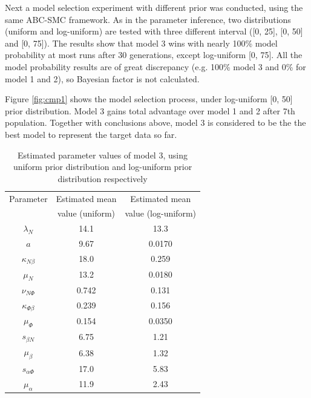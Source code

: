 \documentclass[12pt,a4paper]{report}
\begin{document}
Next a model selection experiment with different prior was conducted, using the same ABC-SMC framework. As in the parameter inference, two distributions (uniform and log-uniform) are tested with three different interval ([0, 25], [0, 50] and [0, 75]). The results show that model 3 wins with nearly 100\% model probability at most runs after 30 generations, except log-uniform [0, 75]. All the model probability results are of great discrepancy (e.g. 100\% model 3 and 0\% for model 1 and 2), so Bayesian factor is not calculated.

Figure \ref{fig:cmp1} shows the model selection process, under log-uniform [0, 50] prior distribution. Model 3 gains total advantage over model 1 and 2 after 7th population. Together with conclusions above, model 3 is considered to be the the best model to represent the target data so far.



\begin{table}[t!]
    \centering
    \begin{tabular}{|c c c|}
        \hline
        Parameter            & Estimated mean  & Estimated mean      \\
                             & value (uniform) & value (log-uniform) \\[0.5ex]
        \hline\hline
        $\lambda_N$          & 14.1            & 13.3                \\
        $a$                  & 9.67            & 0.0170              \\
        $\kappa_{N\beta}$    & 18.0            & 0.259               \\
        $\mu_N$              & 13.2            & 0.0180              \\
        $\nu_{N\Phi}$        & 0.742           & 0.131               \\
        \hline
        $\kappa_{\Phi\beta}$ & 0.239           & 0.156               \\
        $\mu_\Phi$           & 0.154           & 0.0350              \\
        \hline
        $s_{\beta N}$        & 6.75            & 1.21                \\
        $\mu_\beta$          & 6.38            & 1.32                \\
        \hline
        $s_{\alpha\Phi}$     & 17.0            & 5.83                \\
        $\mu_\alpha$         & 11.9            & 2.43                \\
        \hline
    \end{tabular}
    \caption[Estimated parameter values of model 3]
    {Estimated parameter values of model 3, using uniform prior distribution and log-uniform prior distribution respectively}
    \label{table:estimated1}
\end{table}
\end{document}
